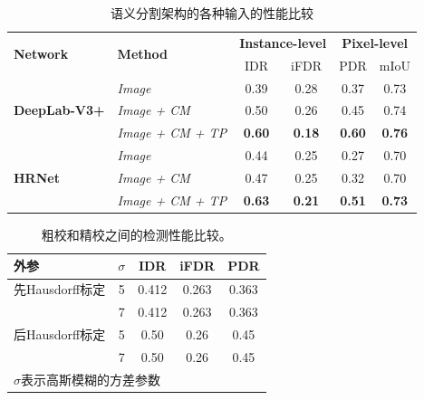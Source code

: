 \documentclass[lang=cn,11pt]{elegantpaper}
\begin{document}
\begin{table}
\centering
\caption{语义分割架构的各种输入的性能比较}
\begin{tabular}{|l|l|c|c|c|c|}
\hline
\multirow{2}{*}{\textbf{Network}} & \multirow{2}{*}{\textbf{Method}} & \multicolumn{2}{|c|}{\textbf{Instance-level}} & \multicolumn{2}{|c|}{\textbf{Pixel-level}}\\

& & IDR & iFDR & PDR & mIoU \\

\hline\hline
     \multirow{3}{5em}{\textbf{DeepLab-V3+}\cite{DeepLab}} & \textit{Image} &  0.39 & 0.28 & 0.37 & 0.73\\
     & \textit{Image + CM} & 0.50 & 0.26 & 0.45 & 0.74\\ 
     & \textit{Image + CM + TP} & \textbf{0.60} & \textbf{0.18} & \textbf{0.60} & \textbf{0.76}\\
     
\hline
    \multirow{3}{5em}{\textbf{HRNet}\cite{HRNet}} & \textit{Image} &  0.44 & 0.25 & 0.27 & 0.70\\
     & \textit{Image + CM} & 0.47 & 0.25 & 0.32 & 0.70\\
     & \textit{Image + CM + TP} & \textbf{0.63} & \textbf{0.21} & \textbf{0.51} & \textbf{0.73}\\ 
\hline
\end{tabular}

\label{tab:results}
\end{table}



\begin{table}[h]%
  \small
  \centering
  \caption{粗校和精校之间的检测性能比较。  }
  \label{tab:5}
  
    \begin{tabular}{l|c|c c c}
    \toprule
           外参    &   $\sigma$  &   IDR & iFDR & PDR     \\
    \midrule%
    先Hausdorff标定   &    5     &   0.412 &  0.263 & 0.363   \\
        &    7     &   0.412 &  0.263 & 0.363   \\
    后Hausdorff标定    &  5 & 0.50 & 0.26 &  0.45 \\
        &  7       & 0.50 & 0.26 &  0.45 \\
    
    \bottomrule%
    \multicolumn{5}{l}{\scriptsize $\sigma$表示高斯模糊的方差参数} \\
    \end{tabular}%
\end{table}%
\end{document}
